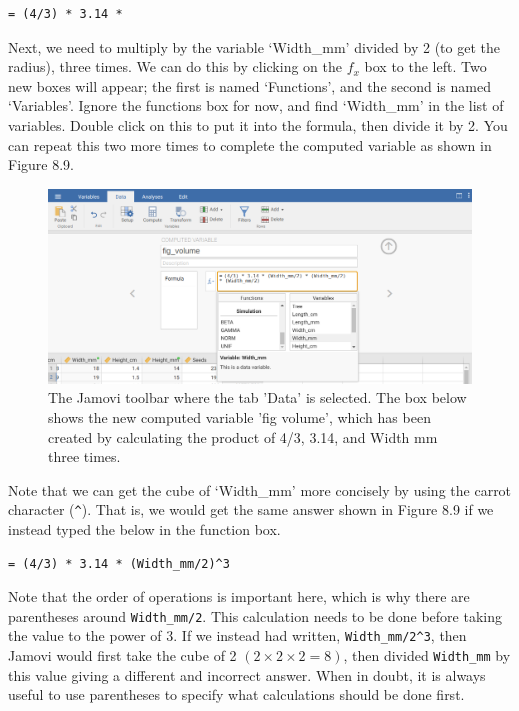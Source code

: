 \documentclass[
]{scrbook}
\begin{document}
\begin{verbatim}
= (4/3) * 3.14 *
\end{verbatim}

Next, we need to multiply by the variable `Width\_mm' divided by 2 (to get the radius), three times. We can do this by clicking on the \(f_{x}\) box to the left.
Two new boxes will appear; the first is named `Functions', and the second is named `Variables'.
Ignore the functions box for now, and find `Width\_mm' in the list of variables.
Double click on this to put it into the formula, then divide it by 2.
You can repeat this two more times to complete the computed variable as shown in Figure 8.9.

\begin{figure}
\includegraphics[width=1\linewidth]{img/jamovi_compute_new_variable} \caption{The Jamovi toolbar where the tab 'Data' is selected. The box below shows the new computed variable 'fig volume', which has been created by calculating the product of 4/3, 3.14, and Width mm three times.}\label{fig:unnamed-chunk-33}
\end{figure}

Note that we can get the cube of `Width\_mm' more concisely by using the carrot character (\texttt{\^{}}).
That is, we would get the same answer shown in Figure 8.9 if we instead typed the below in the function box.

\begin{verbatim}
= (4/3) * 3.14 * (Width_mm/2)^3
\end{verbatim}

Note that the order of operations is important here, which is why there are parentheses around \texttt{Width\_mm/2}. This calculation needs to be done before taking the value to the power of 3. If we instead had written, \texttt{Width\_mm/2\^{}3}, then Jamovi would first take the cube of 2 \((2 \times 2 \times 2 = 8)\), then divided \texttt{Width\_mm} by this value giving a different and incorrect answer. When in doubt, it is always useful to use parentheses to specify what calculations should be done first.
\end{document}

